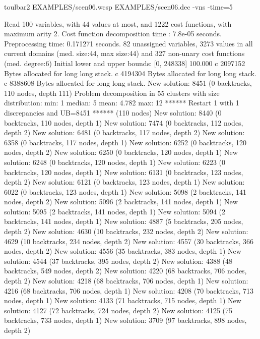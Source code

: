 \begin{enumerate}
\begin{DoxyCode}
	toulbar2 EXAMPLES/scen06.wcsp EXAMPLES/scen06.dec -vns -time=5
\end{DoxyCode}
{\scriptsize
\begin{DoxyCode}
Read 100 variables, with 44 values at most, and 1222 cost functions, with maximum arity 2.
Cost function decomposition time : 7.8e-05 seconds.
Preprocessing time: 0.171271 seconds.
82 unassigned variables, 3273 values in all current domains (med. size:44, max size:44) and 327 non-unary cost functions (med. degree:6)
Initial lower and upper bounds: [0, 248338] 100.000%
c 2097152 Bytes allocated for long long stack.
c 4194304 Bytes allocated for long long stack.
c 8388608 Bytes allocated for long long stack.
New solution: 8451 (0 backtracks, 110 nodes, depth 111)
Problem decomposition in 55 clusters with size distribution: min: 1 median: 5 mean: 4.782 max: 12
****** Restart 1 with 1 discrepancies and UB=8451 ****** (110 nodes)
New solution: 8440 (0 backtracks, 110 nodes, depth 1)
New solution: 7474 (0 backtracks, 112 nodes, depth 2)
New solution: 6481 (0 backtracks, 117 nodes, depth 2)
New solution: 6358 (0 backtracks, 117 nodes, depth 1)
New solution: 6252 (0 backtracks, 120 nodes, depth 2)
New solution: 6250 (0 backtracks, 120 nodes, depth 1)
New solution: 6248 (0 backtracks, 120 nodes, depth 1)
New solution: 6223 (0 backtracks, 120 nodes, depth 1)
New solution: 6131 (0 backtracks, 123 nodes, depth 2)
New solution: 6121 (0 backtracks, 123 nodes, depth 1)
New solution: 6022 (0 backtracks, 123 nodes, depth 1)
New solution: 5098 (2 backtracks, 141 nodes, depth 2)
New solution: 5096 (2 backtracks, 141 nodes, depth 1)
New solution: 5095 (2 backtracks, 141 nodes, depth 1)
New solution: 5094 (2 backtracks, 141 nodes, depth 1)
New solution: 4887 (5 backtracks, 205 nodes, depth 2)
New solution: 4630 (10 backtracks, 232 nodes, depth 2)
New solution: 4629 (10 backtracks, 234 nodes, depth 2)
New solution: 4557 (30 backtracks, 366 nodes, depth 2)
New solution: 4556 (35 backtracks, 383 nodes, depth 1)
New solution: 4544 (37 backtracks, 395 nodes, depth 2)
New solution: 4388 (48 backtracks, 549 nodes, depth 2)
New solution: 4220 (68 backtracks, 706 nodes, depth 2)
New solution: 4218 (68 backtracks, 706 nodes, depth 1)
New solution: 4216 (68 backtracks, 706 nodes, depth 1)
New solution: 4208 (70 backtracks, 713 nodes, depth 1)
New solution: 4133 (71 backtracks, 715 nodes, depth 1)
New solution: 4127 (72 backtracks, 724 nodes, depth 2)
New solution: 4125 (75 backtracks, 733 nodes, depth 1)
New solution: 3709 (97 backtracks, 898 nodes, depth 2)

\end{DoxyCode}}
\end{enumerate}
